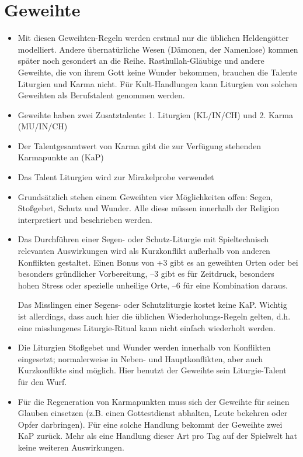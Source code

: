 \chapter{Geweihte}\label{Ch:Geweihte}

\begin{itemize}
	\item Mit diesen Geweihten-Regeln werden erstmal nur die üblichen Heldengötter modelliert. Andere übernatürliche Wesen (Dämonen, der Namenlose) kommen später noch gesondert an die Reihe. Rasthullah-Gläubige und andere Geweihte, die von ihrem Gott keine Wunder bekommen, brauchen die Talente Liturgien und Karma nicht. Für Kult-Handlungen kann Liturgien von solchen Geweihten als Berufstalent genommen werden.
	\item Geweihte haben zwei Zusatztalente: 1. Liturgien (KL/IN/CH) und 2. Karma (MU/IN/CH)
	\item Der Talentgesamtwert von Karma gibt die zur Verfügung stehenden Karmapunkte an (KaP)
	\item Das Talent Liturgien wird zur Mirakelprobe verwendet
	\item Grundsätzlich stehen einem Geweihten vier Möglichkeiten offen: Segen, Stoßgebet, Schutz und Wunder. Alle diese müssen innerhalb der Religion interpretiert und beschrieben werden.
	\item Das Durchführen einer Segen- oder Schutz-Liturgie mit Spieltechnisch relevanten Auswirkungen wird als Kurzkonflikt außerhalb von anderen Konflikten gestaltet. Einen Bonus von +3 gibt es an geweihten Orten oder bei besonders gründlicher Vorbereitung, --3 gibt es für Zeitdruck, besonders hohen Stress oder spezielle unheilige Orte, --6 für eine Kombination daraus.
	
	Das Misslingen einer Segens- oder Schutzliturgie kostet keine KaP. Wichtig ist allerdings, dass auch hier die üblichen Wiederholungs-Regeln gelten, d.h. eine misslungenes Liturgie-Ritual kann nicht einfach wiederholt werden.
	
	\item Die Liturgien Stoßgebet und Wunder werden innerhalb von Konflikten eingesetzt; normalerweise in Neben- und Hauptkonflikten, aber auch Kurzkonflikte sind möglich. Hier benutzt der Geweihte sein Liturgie-Talent für den Wurf.
	
	\item Für die Regeneration von Karmapunkten muss sich der Geweihte für seinen Glauben einsetzen (z.B. einen Gottestdienst abhalten, Leute bekehren oder Opfer darbringen). Für eine solche Handlung bekommt der Geweihte zwei KaP zurück. Mehr als eine Handlung dieser Art pro Tag auf der Spielwelt hat keine weiteren Auswirkungen.
\end{itemize}

